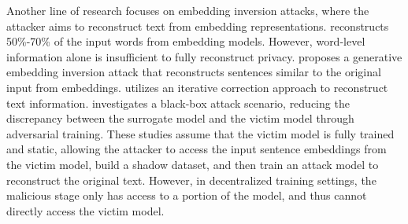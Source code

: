Another line of research focuses on embedding inversion attacks, where the attacker aims to reconstruct text from embedding representations. \citet{song2020information} reconstructs 50\%-70\% of the input words from embedding models. However, word-level information alone is insufficient to fully reconstruct privacy. \citet{li2023sentence} proposes a generative embedding inversion attack that reconstructs sentences similar to the original input from embeddings. \citet{morris2023text} utilizes an iterative correction approach to reconstruct text information. \citet{huang2024transferable} investigates a black-box attack scenario, reducing the discrepancy between the surrogate model and the victim model through adversarial training. These studies assume that the victim model is fully trained and static, allowing the attacker to access the input sentence embeddings from the victim model, build a shadow dataset, and then train an attack model to reconstruct the original text. However, in decentralized training settings, the malicious stage only has access to a portion of the model, and thus cannot directly access the victim model.

